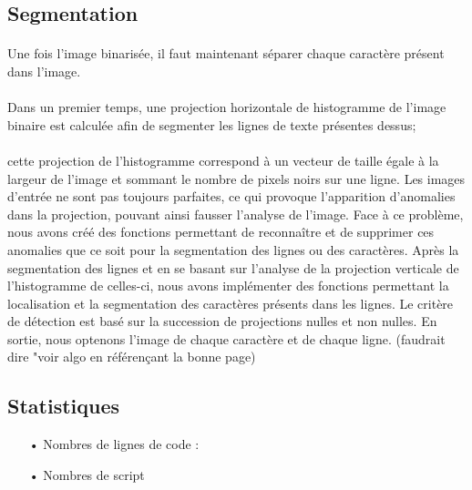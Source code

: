 \documentclass[a4paper]{article}
\begin{document}
				




			

			\subsection{Segmentation} 
				\paragraph{} Une fois l'image binarisée, il faut maintenant séparer chaque caractère présent dans l'image.
				
				\paragraph{} Dans un premier temps, une projection horizontale de histogramme de l'image binaire est calculée afin de segmenter les lignes de texte présentes dessus; 
				\paragraph{} cette projection de l'histogramme correspond à un vecteur de taille égale à la largeur de l'image et sommant le nombre de pixels noirs sur une ligne.%
				Les images d'entrée ne sont pas toujours parfaites, ce qui provoque l'apparition d'anomalies dans la projection, pouvant ainsi fausser l'analyse de l'image. Face à ce problème, nous avons créé des fonctions permettant de reconnaître et de supprimer ces anomalies que ce soit pour la segmentation des lignes ou des caractères.
				Après la segmentation des lignes et en se basant sur l'analyse de la projection verticale de l'histogramme de celles-ci, nous avons implémenter des fonctions permettant la localisation et la segmentation des caractères présents dans les lignes. 
				Le critère de détection est basé sur la succession de projections nulles et non nulles. En sortie, nous optenons l'image de chaque caractère et de chaque ligne.
				(faudrait dire "voir algo en référençant la bonne page)
			
		
		\subsection{Statistiques}
			\begin{itemize}
				\item[•] Nombres de lignes de code : 
				\item[•] Nombres de script
			\end{itemize}
\end{document}
